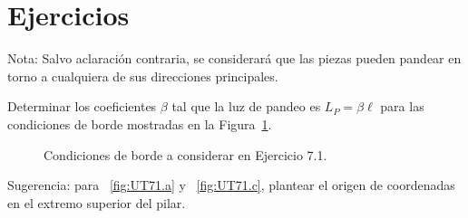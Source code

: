 \newpage

\section{Ejercicios}
\setcounter{ejercicio}{0}

Nota: Salvo aclaración contraria, se considerará que las piezas pueden pandear en torno a cualquiera de sus direcciones principales.

\ejercicio 

Determinar los coeficientes $\beta$ tal que la luz de pandeo es $L_P=\beta\ell$ para las condiciones de borde mostradas en la Figura~\ref{fig:UT71}.

\begin{figure}[htb]
	\centering
	\subfloat[]{
		\texttt{[image: UT7ej1-a]}
		\label{fig:UT71.a}}
	\hspace{0.1\textwidth}
	\subfloat[]{
		\texttt{[image: UT7ej1-b]}
		\label{fig:UT71.b}}
	\hspace{0.1\textwidth}
	\subfloat[]{
		\texttt{[image: UT7ej1-c]}
		\label{fig:UT71.c}}
	\caption{Condiciones de borde a considerar en Ejercicio 7.1.}
	\label{fig:UT71}
\end{figure}

Sugerencia: para ~\ref{fig:UT71.a} y ~\ref{fig:UT71.c}, plantear el origen de coordenadas en el extremo superior del pilar.

%
%

%
%

%
%
%

